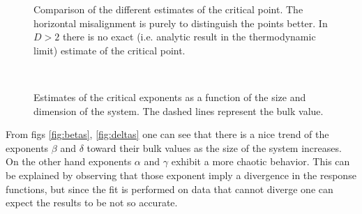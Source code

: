 \documentclass[a4paper, 11pt]{article}
\begin{document}
      \begin{figure}[H]
        \centering
        \begin{subfigure}[]{
          \label{fig:D2_k_c}}
        \end{subfigure}
        \begin{subfigure}[]{
          \label{fig:D3_k_c}}
        \end{subfigure}
        \begin{subfigure}[]{
          \label{fig:D4_k_c}}
        \end{subfigure}
        \caption{Comparison of the different estimates of the critical point. The horizontal misalignment is purely to distinguish the points better. In $D > 2$ there is no exact (i.e. analytic result in the thermodynamic limit) estimate of the critical point.}
      \end{figure}

      \begin{figure}[H]
        \centering
        \begin{subfigure}[Solid $\alpha_1$, dotted $\alpha_2$]{
          \label{fig:alphas}}
        \end{subfigure}
        \begin{subfigure}[]{
          \label{fig:betas}}
        \end{subfigure} \\
        \begin{subfigure}[Solid $\gamma_1$, dotted $\gamma_2$]{
          \label{fig:gammas}}
        \end{subfigure}
        \begin{subfigure}[]{
          \label{fig:deltas}}
        \end{subfigure}
        \caption{Estimates of the critical exponents as a function of the size and dimension of the system. The dashed lines represent the bulk value.}
      \end{figure}

      From figs \ref{fig:betas}, \ref{fig:deltas} one can see that there is a nice trend of the exponents $\beta$ and $\delta$ toward their bulk values as the size of the system increases. On the other hand exponents $\alpha$ and $\gamma$ exhibit a more chaotic behavior. This can be explained by observing that those exponent imply a divergence in the response functions, but since the fit is performed on data that cannot diverge one can expect the results to be not so accurate.
\end{document}
